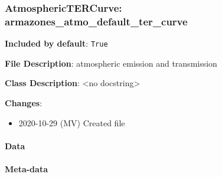 \subsubsection{AtmosphericTERCurve: \textquotedbl{}armazones\_atmo\_default\_ter\_curve\textquotedbl{}%
  \label{atmospherictercurve-armazones-atmo-default-ter-curve}%
}

\textbf{Included by default}: \texttt{True}

\textbf{File Description}: atmospheric emission and transmission

\textbf{Class Description}: <no docstring>

\textbf{Changes}:

\begin{itemize}
\item 2020-10-29 (MV) Created file
\end{itemize}


\paragraph{Data%
  \label{data}%
}

\begin{figure}[H]
\noindent{}\label{fig-armazones-atmo-default-ter-curve}
\end{figure}


\paragraph{Meta-data%
  \label{meta-data}%
}

